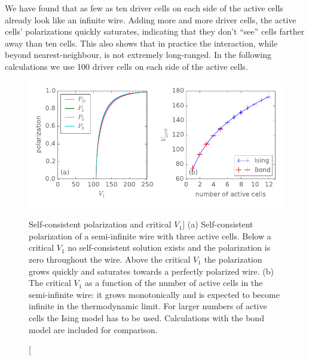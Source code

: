 We have found that as few as ten driver cells on each side of the active cells
already look like an infinite wire. Adding more and more driver cells, the active
cells' polarizations quickly saturates, indicating that they don't ``see'' cells
farther away than ten cells. This also shows that in practice the interaction,
while beyond nearest-neighbour, is not extremely long-ranged. In the following
calculations we use 100 driver cells on each side of the active cells.

\begin{figure}
  \center
  \includegraphics{critical_V1}
  \caption
  [Self-consistent polarization and critical $V_1$]
  {
  (a) Self-consistent polarization of a semi-infinite wire with three active cells.
  Below a critical $V_1$ no self-consistent solution exists and the polarization
  is zero throughout the wire. Above the critical $V_1$ the polarization grows
  quickly and saturates towards a perfectly polarized wire.
  (b) The critical $V_1$ as a function of the number of active cells in the
  semi-infinite wire: it grows monotonically and is expected to become infinite
  in the thermodynamic limit. For larger numbers of active cells the Ising model
  has to be used. Calculations with the bond model are included for comparison.
  }
  \label{fig:critical_V1}
\end{figure}

